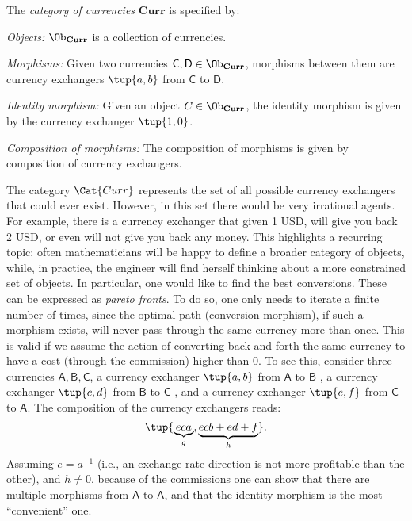 \begin{definition}
    The \emph{category of currencies} $\mathbf{Curr}$ is specified by:
    \begin{compactenum}
        \item \emph{Objects:} $\Ob_\mathbf{Curr}$ is a collection of currencies.
        \item \emph{Morphisms:} Given two currencies $\mathsf{C},\mathsf{D}\in \Ob_{\mathbf{Curr}}$, morphisms between them are currency exchangers $\tup{a,b}$ from $\mathsf{C}$ to $\mathsf{D}$. 
        \item \emph{Identity morphism:} Given an object $C\in \Ob_\mathbf{Curr}$, the identity morphism is given by the currency exchanger $\tup{1,0}$.
        \item \emph{Composition of morphisms:} The composition of morphisms is given by composition of currency exchangers.
    \end{compactenum}
\end{definition}

The category $\Cat{Curr}$ represents the set of all possible currency exchangers that could
ever exist. However, in this set there would be very irrational agents. For example, there is a currency exchanger that given 1 USD, will give you back 2 USD, or even will not give you back any money. This highlights a recurring topic: often mathematicians will be happy to define a broader category of objects, while, in practice, the engineer will find herself thinking about a more constrained set of objects. In particular, one would like to find the best conversions. These can be expressed as \emph{pareto fronts}. To do so, one only needs to iterate a finite number of times, since the optimal path (conversion morphism), if such a morphism exists, will never pass through the same currency more than once.  This is valid if we assume the action of converting back and forth the same currency to have a cost (through the commission) higher than 0. To see this, consider three currencies $\mathsf{A,B,C}$, a currency exchanger $\tup{a,b}$ from $\mathsf{A}$ to $\mathsf{B}$ , a currency exchanger $\tup{c,d}$ from $\mathsf{B}$ to $\mathsf{C}$ , and a currency exchanger $\tup{e,f}$ from $\mathsf{C}$ to $\mathsf{A}$.  The composition of the currency exchangers reads:
\begin{equation}
\tup{\underbrace{eca}_{g}, \underbrace{ecb+ed+f}_{h}}.
\end{equation}
Assuming $e=a^{-1}$ (i.e., an exchange rate direction is not more profitable than the other), and $h\neq 0$, because of the commissions one can show that there are multiple morphisms from $\mathsf{A}$ to $\mathsf{A}$, and that the identity morphism is the most ``convenient'' one.




